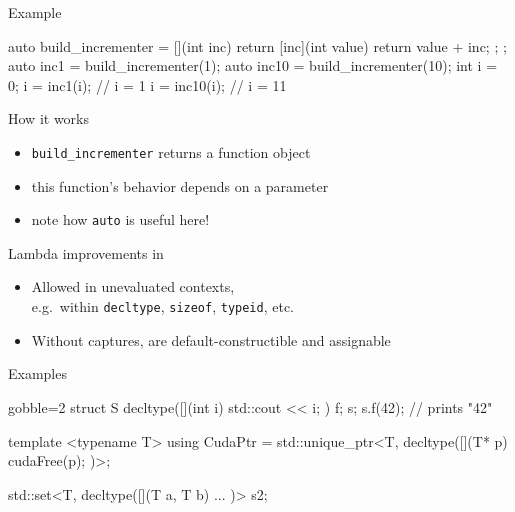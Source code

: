 \begin{frame}[fragile]
  \begin{exampleblock}{Example}
    \begin{cppcode*}{}
      auto build_incrementer = [](int inc) {
        return [inc](int value) { return value + inc; };
      };
      auto inc1 = build_incrementer(1);
      auto inc10 = build_incrementer(10);
      int i = 0;
      i = inc1(i);   // i = 1
      i = inc10(i);  // i = 11
    \end{cppcode*}
  \end{exampleblock}
  \begin{block}{How it works}
    \begin{itemize}
      \item \texttt{build_incrementer} returns a function object
      \item this function's behavior depends on a parameter
      \item note how \texttt{auto} is useful here!
    \end{itemize}
  \end{block}
\end{frame}

\begin{frame}[fragile]
  \begin{block}{Lambda improvements in }
    \begin{itemize}
      \item Allowed in unevaluated contexts,\\
            e.g.\ within \texttt{decltype}, \texttt{sizeof}, \texttt{typeid}, etc.
      \item Without captures, are default-constructible and assignable
    \end{itemize}
  \end{block}
  \begin{exampleblock}{Examples}
    \small
    \begin{cppcode*}{gobble=2}
      struct S {
        decltype([](int i) { std::cout << i; }) f;
      } s;
      s.f(42); // prints "42"

      template <typename T>
      using CudaPtr = std::unique_ptr<T,
                        decltype([](T* p){ cudaFree(p); })>;

      std::set<T, decltype([](T a, T b) { ... })> s2;
    \end{cppcode*}
  \end{exampleblock}

\end{frame}
